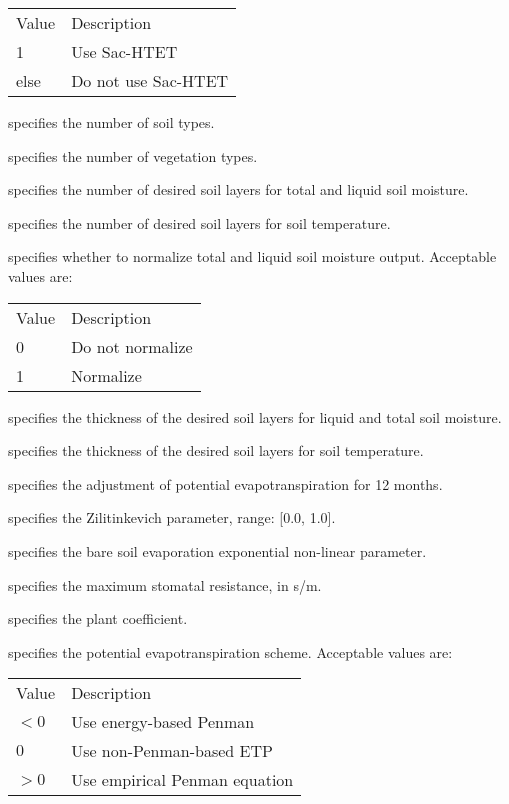  \begin{tabular}{ll}
 Value & Description         \\
 1     & Use Sac-HTET        \\
 else  & Do not use Sac-HTET \\
 \end{tabular}

  specifies the number of soil types.

  specifies the number of vegetation types.

  specifies the number of desired soil
 layers for total and liquid soil moisture.

  specifies the number of desired soil
 layers for soil temperature.

  specifies whether to normalize total
 and liquid soil moisture output.
 Acceptable values are:

 \begin{tabular}{ll}
 Value & Description      \\
 0     & Do not normalize \\
 1     & Normalize        \\
 \end{tabular}

  specifies the thickness of the desired
 soil layers for liquid and total soil moisture.

  specifies the thickness of the desired
 soil layers for soil temperature.

  specifies the adjustment of
 potential evapotranspiration for 12 months.

  specifies the Zilitinkevich parameter,
 range: [0.0, 1.0].

  specifies the bare soil evaporation
 exponential non-linear parameter.

  specifies the maximum stomatal
 resistance, in s/m.

  specifies the plant coefficient.

  specifies the potential
 evapotranspiration scheme.
 Acceptable values are:

 \begin{tabular}{ll}
 Value & Description                   \\
 $<0$  & Use energy-based Penman       \\
 $0$   & Use non-Penman-based ETP      \\
 $>0$  & Use empirical Penman equation \\
 \end{tabular}

